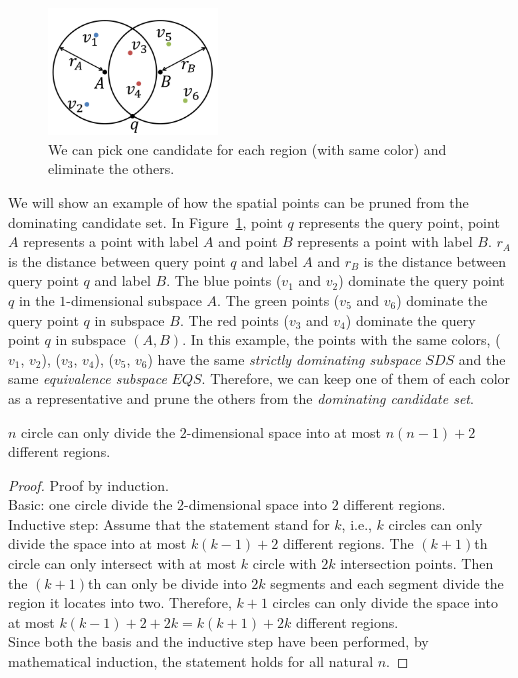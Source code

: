 \begin{figure}[h]
    \centering
      \includegraphics[width=0.4\textwidth]{figs/Circle_Spatial_Example}
    \caption{We can pick one candidate for each region (with same color) and eliminate the others.}
    \label{fig:circle_example}
\end{figure}

We will show an example of how the spatial points can be pruned from the dominating candidate set. In Figure~\ref{fig:circle_example}, point $q$ represents the query point, point $A$ represents a point with label $A$ and point $B$ represents a point with label $B$. $r_{A}$ is the distance between query point $q$ and label $A$ and $r_{B}$ is the distance between query point $q$ and label $B$. The blue points ($v_1$ and $v_2$) dominate the query point $q$ in the $1$-dimensional subspace $A$. The green points ($v_5$ and $v_6$) dominate the query point $q$ in subspace $B$. The red points ($v_3$ and $v_4$) dominate the query point $q$ in subspace $(A, B)$. In this example, the points with the same colors, ($v_1$, $v_2$), ($v_3$, $v_4$), ($v_5$, $v_6$) have the same \emph{strictly dominating subspace} $\mathit{SDS}$ and the same \emph{equivalence subspace} $\mathit{EQS}$. Therefore, we can keep one of them of each color as a representative and prune the others from the \emph{dominating candidate set}.

\begin{property}
\label{ppt:circle_space}
$n$ circle can only divide the $2$-dimensional space into at most $n(n-1)+2$ different regions.
\end{property}

\begin{proof}
Proof by induction.\\
Basic: one circle divide the $2$-dimensional space into $2$ different regions.\\
Inductive step: Assume that the statement stand for $k$, i.e., $k$ circles can only divide the space into at most $k(k-1)+2$ different regions. The $(k+1)$th circle can only intersect with at most $k$ circle with $2k$ intersection points. Then the $(k+1)$th can only be divide into $2k$ segments and each segment divide the region it locates into two. Therefore, $k+1$ circles can only divide the space into at most $k(k-1)+2+2k = k(k+1)+2k$ different regions.\\
Since both the basis and the inductive step have been performed, by mathematical induction, the statement holds for all natural $n$.
\end{proof}

